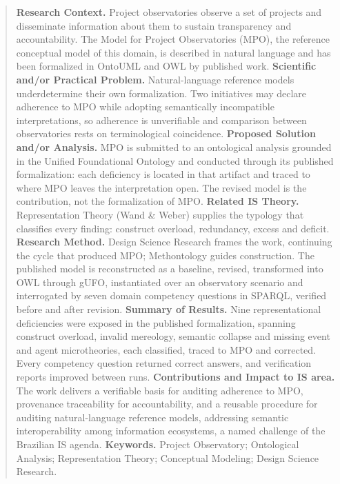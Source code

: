 \documentclass[12pt]{article}
\begin{document}
\begin{abstract}
  \textbf{Research Context.} Project observatories observe a set of projects and
  disseminate information about them to sustain transparency and accountability.
  The Model for Project Observatories (MPO), the reference conceptual model of
  this domain, is described in natural language and has been formalized in
  OntoUML and OWL by published work.
  \textbf{Scientific and/or Practical Problem.} Natural-language reference
  models underdetermine their own formalization. Two initiatives may declare
  adherence to MPO while adopting semantically incompatible interpretations, so
  adherence is unverifiable and comparison between observatories rests on
  terminological coincidence.
  \textbf{Proposed Solution and/or Analysis.} MPO is submitted to an ontological
  analysis grounded in the Unified Foundational Ontology and conducted through
  its published formalization: each deficiency is located in that artifact and
  traced to where MPO leaves the interpretation open. The revised model is the
  contribution, not the formalization of MPO.
  \textbf{Related IS Theory.} Representation Theory (Wand \& Weber) supplies the
  typology that classifies every finding: construct overload, redundancy, excess
  and deficit.
  \textbf{Research Method.} Design Science Research frames the work, continuing
  the cycle that produced MPO; Methontology guides construction. The published
  model is reconstructed as a baseline, revised, transformed into OWL through
  gUFO, instantiated over an observatory scenario and interrogated by seven
  domain competency questions in SPARQL, verified before and after revision.
  \textbf{Summary of Results.} Nine representational deficiencies were exposed
  in the published formalization, spanning construct overload, invalid
  mereology, semantic collapse and missing event and agent microtheories, each
  classified, traced to MPO and corrected. Every competency question returned
  correct answers, and verification reports improved between runs.
  \textbf{Contributions and Impact to IS area.} The work delivers a verifiable
  basis for auditing adherence to MPO, provenance traceability for
  accountability, and a reusable procedure for auditing natural-language
  reference models, addressing semantic interoperability among information
  ecosystems, a named challenge of the Brazilian IS agenda.
  \textbf{Keywords.} Project Observatory; Ontological Analysis; Representation
  Theory; Conceptual Modeling; Design Science Research.
\end{abstract}
\end{document}
